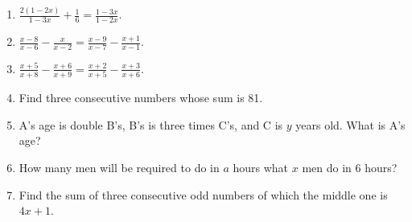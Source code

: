 \documentclass{book}
\begin{document}
\begin{enumerate}
\item $\displaystyle
\frac{2(1-2x)}{1-3x}+\frac{1}{6}=\frac{1-3x}{1-2x}$.

\item $\displaystyle
\frac{x-8}{x-6}-\frac{x}{x-2}=\frac{x-9}{x-7}-\frac{x+1}{x-1}$.

\item $\displaystyle \frac{x+5}{x+8} -
\frac{x+6}{x+9}=\frac{x+2}{x+5}-\frac{x+3}{x+6}$.

\item Find three consecutive numbers whose sum is 81. \item A's
age is double B's, B's is three times C's, and C is $y$ years old.
What is A's age?

\item How many men will be required to do in $a$ hours what $x$
men do in 6 hours?

\item Find the sum of three consecutive odd numbers of which the
middle one is $4x + 1$.
\end{enumerate}
\end{document}
